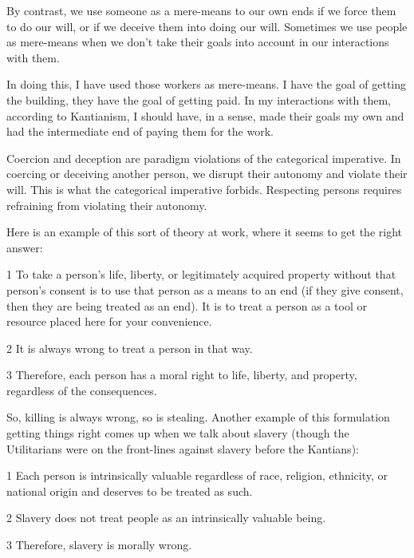 By contrast, we use someone as a mere-means to our own ends if we force them to do our will, or if we deceive them into doing our will. Sometimes we use people as mere-means when we don't take their goals into account in our interactions with them.


In doing this, I have used those workers as mere-means. I have the goal of getting the building, they have the goal of getting paid. In my interactions with them, according to Kantianism, I should have, in a sense, made their goals my own and had the intermediate end of paying them for the work. 

Coercion and deception are paradigm violations of the categorical imperative. In coercing or deceiving another person, we disrupt their autonomy and violate their will. This is what the categorical imperative forbids. Respecting persons requires refraining from violating their autonomy.

Here is an example of this sort of theory at work, where it seems to get the right answer:
\begin{earg}
    \item[1] To take a person’s life, liberty, or legitimately acquired property without that person’s consent is to use that person as a means to an end (if they give consent, then they are being treated as an end). It is to treat a person as a tool or resource placed here for your convenience.
    \item[2] It is always wrong to treat a person in that way.
    \item[3] Therefore, each person has a moral right to life, liberty, and property, regardless of the consequences.
\end{earg}
So, killing is always wrong, so is stealing. Another example of this formulation getting things right comes up when we talk about slavery (though the Utilitarians were on the front-lines against slavery before the Kantians):
\begin{earg}
    \item[1] Each person is intrinsically valuable regardless of race, religion, ethnicity, or national origin and deserves to be treated as such.
    \item[2] Slavery does not treat people as an intrinsically valuable being.
    \item[3] Therefore, slavery is morally wrong.
\end{earg}
